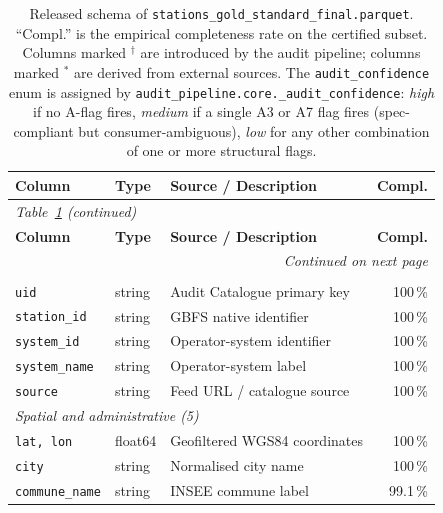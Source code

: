 \documentclass[11pt,a4paper]{article}
\begin{document}
{\scriptsize
\renewcommand{\arraystretch}{0.95}
\setlength{\tabcolsep}{4pt}
\begin{longtable}{@{}lllr@{}}
\caption{Released schema of \texttt{stations\_gold\_standard\_final.parquet}.
``Compl.'' is the empirical completeness rate on the certified subset.
Columns marked $^\dag$ are introduced by the audit pipeline; columns
marked $^\ast$ are derived from external sources. The
\texttt{audit\_confidence} enum is assigned by
\texttt{audit\_pipeline.core.\_audit\_confidence}: \emph{high} if
no A-flag fires, \emph{medium} if a single A3 or A7 flag fires
(spec-compliant but consumer-ambiguous), \emph{low} for any other
combination of one or more structural flags.\label{tab:schema}}\\
\toprule
\textbf{Column} & \textbf{Type} & \textbf{Source / Description} & \textbf{Compl.}\\
\midrule
\endfirsthead
\multicolumn{4}{l}{\textit{Table~\ref{tab:schema} (continued)}}\\
\toprule
\textbf{Column} & \textbf{Type} & \textbf{Source / Description} & \textbf{Compl.}\\
\midrule
\endhead
\midrule
\multicolumn{4}{r}{\textit{Continued on next page}}\\
\endfoot
\bottomrule
\endlastfoot
\multicolumn{4}{l}{\textit{Identifiers (5)}}\\
\quad\texttt{uid}              & string  & Audit Catalogue primary key                 & 100\,\%\\
\quad\texttt{station\_id}       & string  & GBFS native identifier                    & 100\,\%\\
\quad\texttt{system\_id}        & string  & Operator-system identifier                & 100\,\%\\
\quad\texttt{system\_name}      & string  & Operator-system label                     & 100\,\%\\
\quad\texttt{source}            & string  & Feed URL / catalogue source               & 100\,\%\\
\midrule
\multicolumn{4}{l}{\textit{Spatial and administrative (5)}}\\
\quad\texttt{lat, lon}           & float64 & Geofiltered WGS84 coordinates             & 100\,\%\\
\quad\texttt{city}               & string  & Normalised city name                      & 100\,\%\\
\quad\texttt{commune\_name}      & string  & INSEE commune label                       & 99.1\,\%\\

\end{longtable}}
\end{document}
